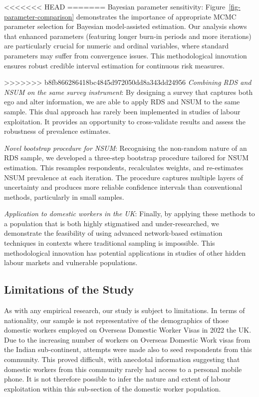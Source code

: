 \documentclass[
  12pt,
  letterpaper,
  DIV=11,
  numbers=noendperiod]{scrartcl}
\theoremstyle{plain}
\theoremstyle{definition}
\begin{document}
{<<<<<<< HEAD
=======
Bayesian parameter sensitivity: Figure~\ref{fig-parameter-comparison}
demonstrates the importance of appropriate MCMC parameter selection for
Bayesian model-assisted estimation. Our analysis shows that enhanced
parameters (featuring longer burn-in periods and more iterations) are
particularly crucial for numeric and ordinal variables, where standard
parameters may suffer from convergence issues. This methodological
innovation ensures robust credible interval estimation for continuous
risk measures.

>>>>>>> b8fb866286418bc4845d972050dd8a343dd24956
\emph{Combining RDS and NSUM on the same survey instrument}: By
designing a survey that captures both ego and alter information, we are
able to apply RDS and NSUM to the same sample. This dual approach has
rarely been implemented in studies of labour exploitation. It provides
an opportunity to cross-validate results and assess the robustness of
prevalence estimates.

\emph{Novel bootstrap procedure for NSUM}: Recognising the non-random
nature of an RDS sample, we developed a three-step bootstrap procedure
tailored for NSUM estimation. This resamples respondents, recalculates
weights, and re-estimates NSUM prevalence at each iteration. The
procedure captures multiple layers of uncertainty and produces more
reliable confidence intervals than conventional methods, particularly in
small samples.

\emph{Application to domestic workers in the UK}: Finally, by applying
these methods to a population that is both highly stigmatised and
under-researched, we demonstrate the feasibility of using advanced
network-based estimation techniques in contexts where traditional
sampling is impossible. This methodological innovation has potential
applications in studies of other hidden labour markets and vulnerable
populations.

\subsection{Limitations of the Study}\label{limitations-of-the-study}

As with any empirical research, our study is subject to limitations. In
terms of nationality, our sample is not representative of the
demographics of those domestic workers employed on Overseas Domestic
Worker Visas in 2022 the UK. Due to the increasing number of workers on
Overseas Domestic Work visas from the Indian sub-continent, attempts
were made also to seed respondents from this community. This proved
difficult, with anecdotal information suggesting that domestic workers
from this community rarely had access to a personal mobile phone. It is
not therefore possible to infer the nature and extent of labour
exploitation within this sub-section of the domestic worker population.

}
\end{document}
